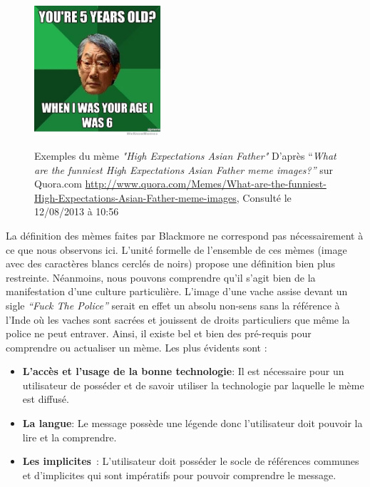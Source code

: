 \begin{figure}
{        \includegraphics[width=1.8449in,height=1.9in]{figures/chap2/chapitre2-img13.jpg}
    }
    \caption[Mème "High Expectations Asian Father" d'après Quora.com]{Exemples du mème \textit{"High Expectations Asian Father"} D{\textquoteright}après {\textquotedblleft}\textit{What are the funniest High Expectations Asian Father meme images?{\textquotedblright}} sur Quora.com \url{http://www.quora.com/Memes/What-are-the-funniest-High-Expectations-Asian-Father-meme-images}, Consulté le 12/08/2013 à 10:56}
\end{figure}

La définition des mèmes faites par Blackmore ne correspond pas nécessairement à ce que nous observons ici. L{\textquoteright}unité formelle de l{\textquoteright}ensemble de ces mèmes (image avec des caractères blancs cerclés de noirs) propose une définition bien plus restreinte. Néanmoins, nous pouvons comprendre qu{\textquoteright}il s{\textquoteright}agit bien de la manifestation d{\textquoteright}une culture particulière. L{\textquoteright}image d{\textquoteright}une vache assise devant un sigle \textit{{\textquotedblleft}Fuck The Police{\textquotedblright} }serait en effet un absolu non-sens sans la référence à l{\textquoteright}Inde o\`u les vaches sont sacrées et jouissent de droits particuliers que même la police ne peut entraver. Ainsi, il existe bel et bien des pré-requis pour comprendre ou actualiser un mème. Les plus évidents sont :

\begin{itemize}
    \item \textbf{L’accès et l’usage de la bonne technologie}: Il est nécessaire pour un utilisateur de posséder et de savoir utiliser la technologie par laquelle le mème est diffusé.
    \item \textbf{La langue}: Le message possède une légende donc l’utilisateur doit pouvoir la lire et la comprendre.
    \item \textbf{Les implicites} : L’utilisateur doit posséder le socle de références communes et d’implicites qui sont impératifs pour pouvoir comprendre le message. 
\end{itemize}

